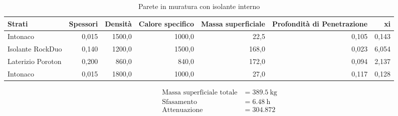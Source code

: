 \begin{table}
\centering
\caption{Parete in muratura con isolante interno}
\begin{tabular}{lrrrrrr}
\toprule
            Strati & Spessori & Densità & Calore specifico & Massa superficiale & Profondità di Penetrazione &     xi \\
\midrule
          Intonaco &    0,015 &  1500,0 &           1000,0 &               22,5 &                      0,105 &  0,143 \\
  Isolante RockDuo &    0,140 &  1200,0 &           1500,0 &              168,0 &                      0,023 &  6,054 \\
 Laterizio Poroton &    0,200 &   860,0 &            840,0 &              172,0 &                      0,094 &  2,137 \\
          Intonaco &    0,015 &  1800,0 &           1000,0 &               27,0 &                      0,117 &  0,128 \\
\bottomrule
\end{tabular}
\end{table}

\begin{flushleft}
\begin{align*}
\text{Massa superficiale totale} &= \SI{389.5}{\kilo\gram}\\
\text{Sfasamento} &= \SI{6.48}{\hour}\\
\text{Attenuazione} &= \SI{304.872}{}
\end{align*}
\end{flushleft}
